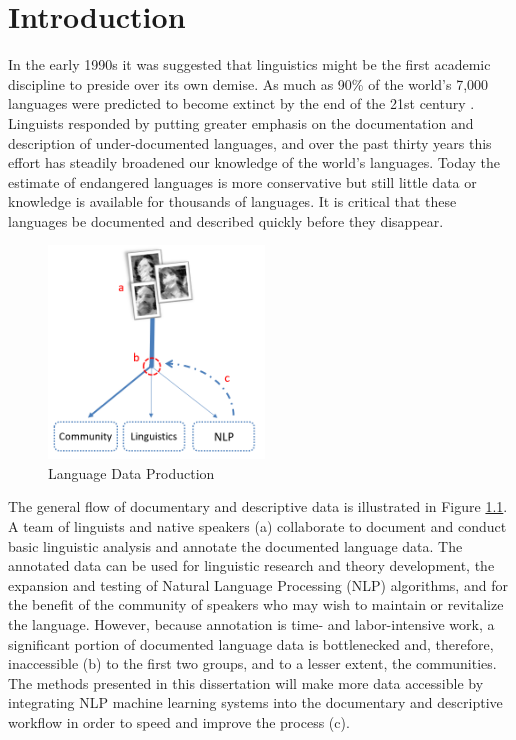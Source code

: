 \chapter{Introduction}
\label{chap:intro}

In the early 1990s it was suggested that linguistics might be the first academic discipline to preside over its own demise. As much as 90\% of the world’s 7,000 languages were predicted to become extinct by the end of the 21st century \citep{krauss_worlds_1992,krauss_keynote--mass_2007,campbell_new_2013}. 
Linguists responded by putting greater emphasis on the documentation and description of under-documented languages, and over the past thirty years this effort has steadily broadened our knowledge of the world's languages. Today the estimate of endangered languages is more conservative \citep{eberhard_ethnologue:2020} but still little data or knowledge is available for thousands of languages. It is critical that these languages be documented and described quickly before they disappear. %

\begin{figure}[tb]
\centering
\includegraphics[width=5.75cm]{figs/Flowchart.PNG}
\caption[Language Data Production]{Language Data Production}
\label{fig:flowchart}
\end{figure}

The general flow of documentary and descriptive data is illustrated in Figure \ref{fig:flowchart}. A team of linguists and native speakers (a) collaborate to document and conduct basic linguistic analysis and annotate the documented language data. The annotated data can be used for linguistic research and theory development, the expansion and testing of Natural Language Processing (NLP) algorithms, and for the benefit of the community of speakers who may wish to maintain or revitalize the language. However, because annotation is time- and labor-intensive work, a significant portion of documented language data is bottlenecked and, therefore, inaccessible (b) to the first two groups, and to a lesser extent, the communities. The methods presented in this dissertation will make more data accessible by integrating NLP machine learning systems into the documentary and descriptive workflow in order to speed and improve the process (c).


